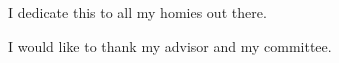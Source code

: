 %
%
%
%

\begin{dedication}
  I dedicate this to all my homies out there.
\end{dedication}

\begin{acknowledgments}
  I would like to thank my advisor and my committee.
\end{acknowledgments}


\tableofcontents

\listoftables

